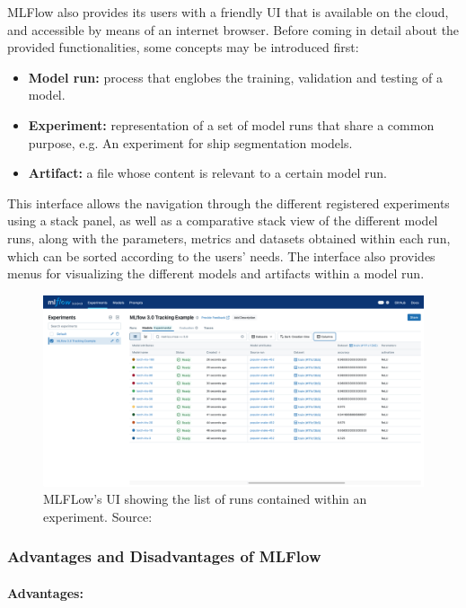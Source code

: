 MLFlow also provides its users with a friendly \acrfull{UI} that is available on the cloud, and accessible by means of an internet browser. Before coming in detail
about the provided functionalities, some concepts may be introduced first:

\begin{itemize}
    \item \textbf{Model run: }process that englobes the training, validation and testing of a model.
    \item \textbf{Experiment: }representation of a set of model runs that share a common purpose, e.g. An experiment for ship segmentation models.
    \item \textbf{Artifact: }a file whose content is relevant to a certain model run.
\end{itemize}

This interface allows the navigation through the different registered experiments using a stack panel, as well as a comparative stack view of the different model runs, 
along with the parameters, metrics and datasets obtained within each run, which can be sorted according to the users' needs. The interface also provides menus for 
visualizing the different models and artifacts within a model run.


\begin{figure}[H]
    \centering
    \includegraphics[width=0.8\linewidth]{figs/mlflow-ui.png}
    \caption{MLFLow's \acrshort{UI} showing the list of runs contained within an experiment. Source:\cite{mlflowtracking}}
    \label{fig:MLFlowUI}
\end{figure}

\subsubsection{Advantages and Disadvantages of MLFlow\cite{mlflowproscons} }

\paragraph{Advantages:}

